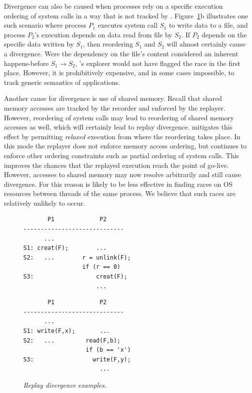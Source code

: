 Divergence can also be caused when processes rely on a specific
execution ordering of system calls in a way that is not tracked by
\racepro.  Figure~\ref{racepro:fig:diverge}b illustrates one such scenario where
process $P_1$ executes system call $S_1$ to write data to a file, and
process $P_2$'s execution depends on data read from file by $S_2$. If
$P_2$ depends on the specific data written by $S_1$, then reordering
$S_1$ and $S_2$ will almost certainly cause a divergence. Were the
dependency on the file's content considered an inherent happens-before
$S_1 \rightarrow S_2$, \racepro's explorer would not have flagged the race
in the first place. However, it is prohibitively expensive, and in
some cases impossible, to track generic semantics of applications.

Another cause for divergence is use of shared memory. Recall that
shared memory accesses are tracked by the recorder and enforced by the
replayer. However, reordering of system calls may lead to reordering
of shared memory accesses as well, which will certainly lead to replay
divergence. \racepro mitigates this effect by permitting \emph{relaxed}
execution from where the reordering takes place. In this mode the
replayer does not enforce memory access ordering, but continues to
enforce other ordering constraints such as partial ordering of system
calls. This improves the chances that the replayed execution reach the
point of go-live.  However, accesses to shared memory may
now resolve arbitrarily and still cause divergence. For this reason
\racepro is likely to be less effective in finding races on OS resources
between threads of the same process.  We believe that such races are
relatively unlikely to occur.

\begin{figure}[t]
\begin{minipage}{\linewidth}
  \begin{minipage}{.6\linewidth}
\begin{footnotesize}
\begin{verbatim}
       P1             P2
-----------------------------
      ...
S1: creat(F);        ...
S2:   ...        r = unlink(F);
                 if (r == 0)
S3:                  creat(F);
                     ...
\end{verbatim}
\end{footnotesize}
  \end{minipage}
  \begin{minipage}{.39\linewidth}
\begin{footnotesize}
\begin{verbatim}
       P1             P2
-----------------------------
      ...
S1: write(F,x);       ...
S2:   ...         read(F,b);
                  if (b == 'x')
S3:                 write(F,y);
                      ...
\end{verbatim}
\end{footnotesize}
  \end{minipage}
  \caption{{\em Replay divergence examples.}} \label{racepro:fig:diverge}
\end{minipage}
\end{figure}

